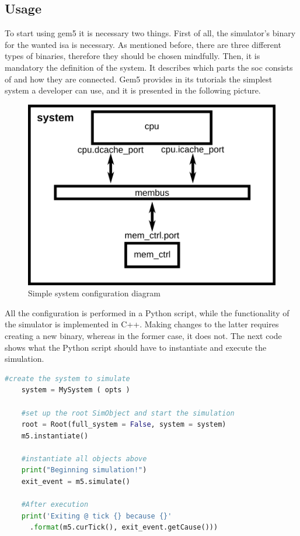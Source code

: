 
\subsection{Usage}

To start using gem5 it is necessary two things. First of all, the simulator's binary for the wanted \gls{isa} is necessary. As mentioned before, there are three different types of binaries, therefore they should be chosen mindfully. Then, it is mandatory the definition of the system. It describes which parts the \gls{soc} consists of and how they are connected. Gem5 provides in its tutorials the simplest system a developer can use, and it is presented in the following picture.

\begin{figure}[H]
	\centering
 	\includegraphics[width=0.5\linewidth]{Images/simple_config.png}
 	\caption{Simple system configuration diagram}
	 \label{fig_simple_config}
\end{figure}

All the configuration is performed in a Python script, while the functionality of the simulator is implemented in C++. Making changes to the latter requires creating a new binary, whereas in the former case, it does not. The next code shows what the Python script should have to instantiate and execute the simulation. 

\begin{lstlisting}[language=Python, caption=Script to instantiate and execute the simulation]
    #create the system to simulate
    system = MySystem ( opts )

    #set up the root SimObject and start the simulation
    root = Root(full_system = False, system = system)
    m5.instantiate()

    #instantiate all objects above
    print("Beginning simulation!")
    exit_event = m5.simulate()

    #After execution
    print('Exiting @ tick {} because {}'
      .format(m5.curTick(), exit_event.getCause()))

\end{lstlisting}

